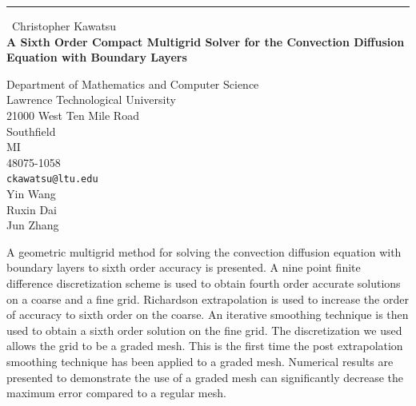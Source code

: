 \documentclass{report}
\begin{document}
\begin{center}
\rule{6in}{1pt} \
{\large Christopher Kawatsu \\
{\bf A Sixth Order Compact Multigrid Solver for the Convection Diffusion Equation with Boundary Layers}}

Department of Mathematics and Computer Science \\ Lawrence Technological University \\ 21000 West Ten Mile Road \\ Southfield \\ MI \\ 48075-1058
\\
{\tt ckawatsu@ltu.edu}\\
Yin Wang\\
Ruxin Dai\\
Jun Zhang\end{center}

A geometric multigrid method for solving the convection diffusion
equation with boundary layers to sixth order accuracy is presented. A
nine point finite difference discretization scheme is used to obtain
fourth order accurate solutions on a coarse and a fine grid. Richardson
extrapolation is used to increase the order of accuracy to sixth order on
the coarse. An iterative smoothing technique is then used to obtain a
sixth order solution on the fine grid. The discretization we used allows
the grid to be a graded mesh. This is the first time the post
extrapolation smoothing technique has been applied to a graded mesh.
Numerical results are presented to demonstrate the use of a graded mesh
can significantly decrease the maximum error compared to a regular mesh.
\end{document}
